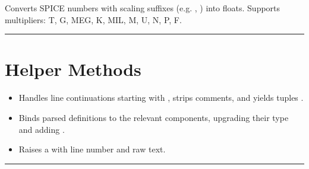 \documentclass[letterpaper,10pt,english]{sphinxmanual}
\begin{document}

\begin{fulllineitems}
\label{\detokenize{parser:NetlistParser._parse_value}}
\pysigstartsignatures
\pysiglinewithargsret
{}
{}
{}
\pysigstopsignatures
\sphinxAtStartPar
Converts SPICE numbers with scaling suffixes (e.g. , ) into floats.
Supports multipliers: T, G, MEG, K, MIL, M, U, N, P, F.

\end{fulllineitems}



\bigskip\hrule\bigskip



\section{Helper Methods}
\label{\detokenize{parser:helper-methods}}\begin{itemize}
\item {} 
\sphinxAtStartPar
{} \textendash{} Handles line continuations starting with \sphinxcode{\sphinxupquote{+}},
strips comments, and yields tuples .

\item {} 
\sphinxAtStartPar
{} \textendash{} Binds parsed  definitions to the relevant
components, upgrading their type and adding .

\item {} 
\sphinxAtStartPar
{} \textendash{} Raises a  with line number and raw text.

\end{itemize}


\bigskip\hrule\bigskip
\end{document}
